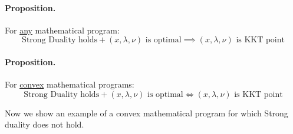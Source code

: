 \documentclass[answers]{exam}
\begin{document}
    \paragraph{Proposition.} For \underline{any} mathematical program: 
    $$ \text{Strong Duality holds} + \text{$(x,\lambda,\nu)$ is optimal} \implies \text{$(x, \lambda, \nu)$ is KKT point} $$
    \paragraph{Proposition.} For \underline{convex} mathematical programs: 
    $$ \text{Strong Duality holds} + \text{$(x,\lambda,\nu)$ is optimal} \iff \text{$(x, \lambda, \nu)$ is KKT point} $$

    Now we show an example of a convex mathematical program for which Strong duality does not hold. 
\end{document}
